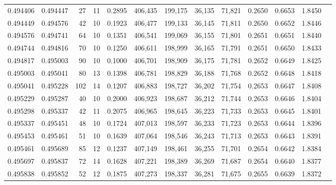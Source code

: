 \begin{tabular}{rrrrrrrrrrrrr}
0.494406 & 0.494447 &    27 &  11 &                                     0.2895 & 406,435 & 199,175 &  36,135 &  71,821 & 0.2650 & 0.6653 & 1.8450 \\
0.494449 & 0.494576 &    42 &  10 &                                     0.1923 & 406,477 & 199,133 &  36,145 &  71,811 & 0.2650 & 0.6652 & 1.8446 \\
0.494576 & 0.494741 &    64 &  10 &                                     0.1351 & 406,541 & 199,069 &  36,155 &  71,801 & 0.2651 & 0.6651 & 1.8440 \\
0.494744 & 0.494816 &    70 &  10 &                                     0.1250 & 406,611 & 198,999 &  36,165 &  71,791 & 0.2651 & 0.6650 & 1.8433 \\
0.494817 & 0.495003 &    90 &  10 &                                     0.1000 & 406,701 & 198,909 &  36,175 &  71,781 & 0.2652 & 0.6649 & 1.8425 \\
0.495003 & 0.495041 &    80 &  13 &                                     0.1398 & 406,781 & 198,829 &  36,188 &  71,768 & 0.2652 & 0.6648 & 1.8418 \\
0.495041 & 0.495228 &   102 &  14 &                                     0.1207 & 406,883 & 198,727 &  36,202 &  71,754 & 0.2653 & 0.6647 & 1.8408 \\
0.495229 & 0.495287 &    40 &  10 &                                     0.2000 & 406,923 & 198,687 &  36,212 &  71,744 & 0.2653 & 0.6646 & 1.8404 \\
0.495298 & 0.495337 &    42 &  11 &                                     0.2075 & 406,965 & 198,645 &  36,223 &  71,733 & 0.2653 & 0.6645 & 1.8401 \\
0.495337 & 0.495451 &    48 &  10 &                                     0.1724 & 407,013 & 198,597 &  36,233 &  71,723 & 0.2653 & 0.6644 & 1.8396 \\
0.495453 & 0.495461 &    51 &  10 &                                     0.1639 & 407,064 & 198,546 &  36,243 &  71,713 & 0.2653 & 0.6643 & 1.8391 \\
0.495461 & 0.495689 &    85 &  12 &                                     0.1237 & 407,149 & 198,461 &  36,255 &  71,701 & 0.2654 & 0.6642 & 1.8384 \\
0.495697 & 0.495837 &    72 &  14 &                                     0.1628 & 407,221 & 198,389 &  36,269 &  71,687 & 0.2654 & 0.6640 & 1.8377 \\
0.495838 & 0.495852 &    52 &  12 &                                     0.1875 & 407,273 & 198,337 &  36,281 &  71,675 & 0.2655 & 0.6639 & 1.8372 \\

\end{tabular}
